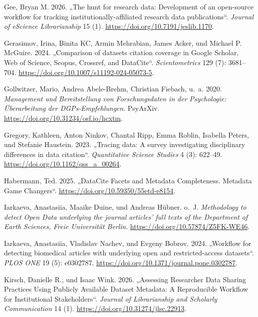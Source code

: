 \documentclass[
  ngerman,
  letterpaper,
  DIV=11]{scrreprt}
\newlength{\cslhangindent}
\newenvironment{CSLReferences}[2] %
 {\begin{list}{}{%
  \setlength{\itemindent}{0pt}
  \setlength{\leftmargin}{0pt}
  \setlength{\parsep}{0pt}
  \ifodd #1
   \setlength{\leftmargin}{\cslhangindent}
   \setlength{\itemindent}{-1\cslhangindent}
  \fi
  \setlength{\itemsep}{#2\baselineskip}}}
 {\end{list}}
\begin{document}
\begin{CSLReferences}{1}{1}
Gee, Bryan M. 2026. {„The hunt for research data: Development of an
open-source workflow for tracking institutionally-affiliated research
data publications``}. \emph{Journal of {eScience} Librarianship} 15 (1).
\url{https://doi.org/10.7191/jeslib.1170}.

Gerasimov, Irina, Binita KC, Armin Mehrabian, James Acker, und Michael
P. McGuire. 2024. {„Comparison of datasets citation coverage in Google
Scholar, Web of Science, Scopus, Crossref, and {DataCite}``}.
\emph{Scientometrics} 129 (7): 3681--704.
\url{https://doi.org/10.1007/s11192-024-05073-5}.

Gollwitzer, Mario, Andrea Abele-Brehm, Christian Fiebach, u.~a. 2020.
\emph{Management und Bereitstellung von Forschungsdaten in der
Psychologie: Überarbeitung der {DGPs}-Empfehlungen}. {PsyArXiv}.
\url{https://doi.org/10.31234/osf.io/hcxtm}.

Gregory, Kathleen, Anton Ninkov, Chantal Ripp, Emma Roblin, Isabella
Peters, und Stefanie Haustein. 2023. {„Tracing data: A survey
investigating disciplinary differences in data citation``}.
\emph{Quantitative Science Studies} 4 (3): 622--49.
\url{https://doi.org/10.1162/qss_a_00264}.

Habermann, Ted. 2025. {„{DataCite} Facets and Metadata Completeness.
Metadata Game Changers``}. \url{https://doi.org/10.59350/55etd-e8154}.

Iarkaeva, Anastasiia, Maaike Duine, und Andreas Hübner. o.~J.
\emph{Methodology to detect Open Data underlying the journal articles'
full texts of the Department of Earth Sciences, Freie Universität
Berlin}. \url{https://doi.org/10.57874/Z5FK-WE46}.

Iarkaeva, Anastasiia, Vladislav Nachev, und Evgeny Bobrov. 2024.
{„Workflow for detecting biomedical articles with underlying open and
restricted-access datasets``}. \emph{{PLOS} {ONE}} 19 (5): e0302787.
\url{https://doi.org/10.1371/journal.pone.0302787}.

Kirsch, Danielle R., und Isaac Wink. 2026. {„Assessing Researcher Data
Sharing Practices Using Publicly Available Dataset Metadata: A
Reproducible Workflow for Institutional Stakeholders``}. \emph{Journal
of Librarianship and Scholarly Communication} 14 (1).
\url{https://doi.org/10.31274/jlsc.22913}.


\end{CSLReferences}
\end{document}
